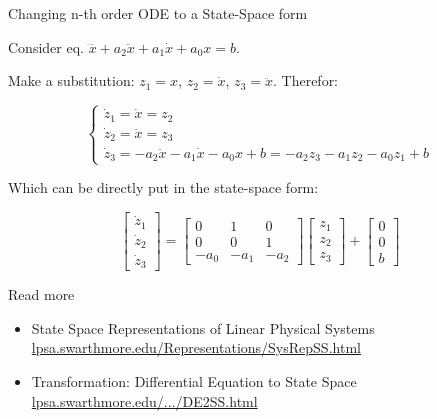 \documentclass{beamer}
\begin{document}
\begin{frame}{Changing n-th order ODE to a State-Space form}
\begin{flushleft}

Consider eq. $\dddot{x} + a_2 \ddot{x} + a_1 \dot{x} + a_0 x = b$.

\bigskip

Make a substitution: $z_1 = x$, $z_2 = \dot{x}$, $z_3 = \ddot{x}$. Therefor:

\begin{equation}
    \begin{cases}
        \dot{z}_1 = \dot{x} = z_2 \\
        \dot{z}_2 = \ddot{x} = z_3 \\
        \dot{z}_3 =  -a_2 \ddot{x} - a_1 \dot{x} - a_0 x + b = 
        -a_2 z_3 - a_1 z_2 - a_0 z_1 + b
    \end{cases}
\end{equation}

Which can be directly put in the state-space form:

\begin{equation}
\begin{bmatrix}
\dot{z}_1 \\ \dot{z}_2 \\ \dot{z}_3
\end{bmatrix} 
=
\begin{bmatrix}
0 & 1 & 0 \\ 
0 & 0 & 1 \\
-a_0 & -a_1 & -a_2
\end{bmatrix} 
\begin{bmatrix}
z_1 \\ z_2 \\ z_3
\end{bmatrix} 
+ 
\begin{bmatrix}
0 \\ 0 \\ b
\end{bmatrix}
\end{equation}


\end{flushleft}
\end{frame}




\begin{frame}{Read more}

\begin{itemize}
\item State Space Representations of Linear Physical Systems \href{https://lpsa.swarthmore.edu/Representations/SysRepSS.html}{lpsa.swarthmore.edu/Representations/SysRepSS.html}

\item Transformation: Differential Equation to State Space \href{https://lpsa.swarthmore.edu/Representations/SysRepTransformations/DE2SS.html}{lpsa.swarthmore.edu/.../DE2SS.html}
\end{itemize}

\end{frame}
\end{document}
